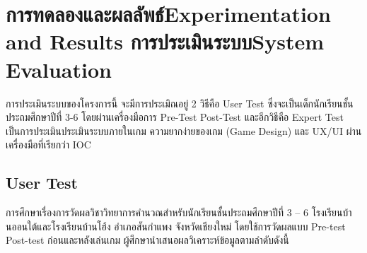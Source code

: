 \chapter{\ifproject%
\ifcpe การทดลองและผลลัพธ์\else Experimentation and Results\fi
\else%
\ifcpe การประเมินระบบ\else System Evaluation\fi
\fi}

การประเมินระบบของโครงการนี้ จะมีการประเมิณอยู่ 2 วิธีคือ User Test ซึ่งจะเป็นเด็กนักเรียนชั้นประถมศึกษาปีที่ 3-6 โดยผ่านเครื่องมือการ Pre-Test
Post-Test และอีกวิธีคือ Expert Test เป็นการประเมินประเมินระบบภายในเกม ความยากง่ายของเกม (Game Design) และ UX/UI ผ่าน
เครื่องมือที่เรียกว่า IOC

\section{User Test}
การศึกษาเรื่องการวัดผลวิชาวิทยาการคำนวณสำหรับนักเรียนชั้นประถมศึกษาปีที่ 3 – 6 
โรงเรียนบ้านออนใต้และโรงเรียนบ้านโฮ้ง อำเภอสันกำแพง
 จังหวัดเชียงใหม่ โดยใช้การวัดผลแบบ Pre-test Post-test ก่อนและหลังเล่นเกม ผู้ศึกษานำเสนอผลวิเคราะห์ข้อมูลตามลำดับดังนี้
